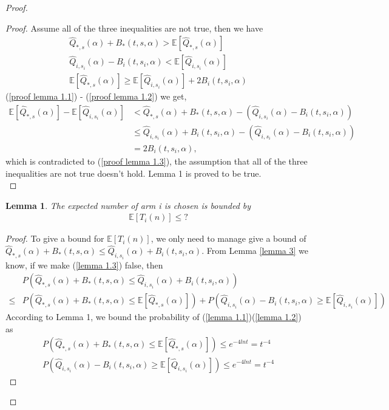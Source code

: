 \documentclass{article}
\theoremstyle{plain}
\newtheorem{lemma}{Lemma}
\begin{document}
\begin{proof}
\begin{proof}
Assume all of the three inequalities are not true, then we have
    \begin{align}
        \label{proof lemma 1.1}
         \hat{Q}_{*, s}(\alpha) + B_*(t, s, \alpha) >  \mathbb{E}[\hat{Q}_{*, s}(\alpha)]\\
        \label{proof lemma 1.2}
        \hat{Q}_{i, s_i}(\alpha) - B_i(t, s_i, \alpha) < \mathbb{E}[\hat{Q}_{i, s_i}(\alpha)]\\
        \label{proof lemma 1.3}
        \mathbb{E}[\hat{Q}_{*, s}(\alpha)] \geq \mathbb{E}[\hat{Q}_{i, s_i}(\alpha)] + 2 B_i(t, s_i, \alpha)
    \end{align}
    (\ref{proof lemma 1.1}) - (\ref{proof lemma 1.2}) we get,
    \begin{align}
         \mathbb{E}[\hat{Q}_{*, s}(\alpha)] - \mathbb{E}[\hat{Q}_{i, s_i}(\alpha)] &<
         \hat{Q}_{*, s}(\alpha) + B_*(t, s, \alpha) - (\hat{Q}_{i, s_i}(\alpha) - B_i(t, s_i, \alpha)) \\
        & \leq \hat{Q}_{i, s_i}(\alpha) + B_i(t, s_i, \alpha) - (\hat{Q}_{i, s_i}(\alpha) - B_i(t, s_i, \alpha)) \\
        &= 2 B_i(t, s_i, \alpha),
    \end{align}
    which is contradicted to (\ref{proof lemma 1.3}), the assumption that all of the three inequalities are not true doesn't hold. Lemma 1 is proved to be true.\\
\end{proof}

\begin{lemma}
    The expected number of arm i is chosen is bounded by
    \begin{align}
        \mathbb{E}[T_i(n)] \leq ?
    \end{align}
\end{lemma}

\begin{proof}
To give a bound for $\mathbb{E}[T_i(n)]$, we only need to manage give a bound of $\hat{Q}_{*, s}(\alpha) + B_*(t, s, \alpha)  \leq \hat{Q}_{i, s_i}(\alpha) + B_i(t, s_i, \alpha)$. From Lemma \ref{lemma 3} we know, if we make (\ref{lemma 1.3}) false, then
\begin{align}
    & P(\hat{Q}_{*, s}(\alpha) + B_*(t, s, \alpha)  \leq \hat{Q}_{i, s_i}(\alpha) + B_i(t, s_i, \alpha)) \\
    \leq &  P(\hat{Q}_{*, s}(\alpha) + B_*(t, s, \alpha) \leq  \mathbb{E}[\hat{Q}_{*, s}(\alpha)]) + P(\hat{Q}_{i, s_i}(\alpha) - B_i(t, s_i, \alpha) \geq \mathbb{E}[\hat{Q}_{i, s_i}(\alpha)])
\end{align}
According to Lemma 1, we bound the probability of (\ref{lemma 1.1})(\ref{lemma 1.2}) as
    \begin{align}
        P(\hat{Q}_{*, s}(\alpha) + B_*(t, s, \alpha) \leq  \mathbb{E}[\hat{Q}_{*, s}(\alpha)]) \leq  e^{-4lnt} = t^{-4}\\
        P(\hat{Q}_{i, s_i}(\alpha) - B_i(t, s_i, \alpha) \geq \mathbb{E}[\hat{Q}_{i, s_i}(\alpha)])  \leq  e^{-4lnt} = t^{-4}
    \end{align}


\end{proof}
\end{proof}
\end{document}
